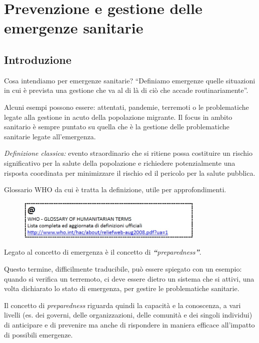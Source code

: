 \section{Prevenzione e gestione delle emergenze sanitarie}

\subsection{Introduzione}

Cosa intendiamo per emergenze sanitarie? ``Definiamo emergenze quelle
situazioni in cui è prevista una gestione che va al di là di ciò che
accade routinariamente''.

Alcuni esempi possono essere: attentati, pandemie, terremoti o le
problematiche legate alla gestione in acuto della popolazione migrante.
Il focus in ambito sanitario è sempre puntato su quella che è la
gestione delle problematiche sanitarie legate all'emergenza.

\emph{Definizione classica:} evento straordinario che si ritiene possa
costituire un rischio significativo per la salute della popolazione e
richiedere potenzialmente una risposta coordinata per minimizzare il
rischio ed il pericolo per la salute pubblica.

Glossario WHO da cui è tratta la definizione, utile per approfondimenti.

\begin{figure}[!ht]
\centering
	\includegraphics[width=0.8\textwidth]{26/image1.jpeg}
	\end{figure}

Legato al concetto di emergenza è il concetto di
\emph{\textbf{``}preparedness\textbf{''}}.

Questo termine, difficilmente traducibile, può essere spiegato con un
esempio: quando si verifica un terremoto, ci deve essere dietro un
sistema che si attivi, una volta dichiarato lo stato di emergenza, per
gestire le problematiche sanitarie.

Il concetto di \emph{preparedness} riguarda quindi la capacità e la
conoscenza, a vari livelli (es. dei governi, delle organizzazioni, delle
comunità e dei singoli individui) di anticipare e di prevenire ma anche
di rispondere in maniera efficace all'impatto di possibili emergenze.

